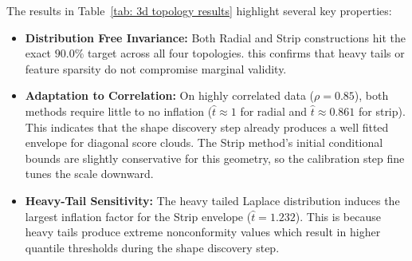 \begin{table}[!htbp]
\centering
{}
\caption{Geometric adaptation benchmark across $3\text{D}$ score topologies ($\alpha = 0.10, N = 400$). Both Radial ($M=150$) 
and Strip ($M_{\text{bin}}=12$) envelopes achieve exact nominal coverage under distributional misspecification.}
\label{tab: 3d topology results}
\end{table}

The results in Table~\ref{tab: 3d topology results} highlight several key properties:
\begin{itemize}
    \item \textbf{Distribution Free Invariance:} Both Radial and Strip constructions hit the exact $90.0\%$ target across 
           all four topologies. this confirms that heavy tails or feature sparsity do not compromise marginal validity.
    \item \textbf{Adaptation to Correlation:} On highly correlated data ($\rho = 0.85$), both methods require little to no 
          inflation ($\hat t \approx 1$ for radial and $\hat t \approx 0.861$ for strip). This indicates that the shape 
          discovery step already produces a well fitted envelope for diagonal score clouds. The Strip method's initial 
          conditional bounds are slightly conservative for this geometry, so the calibration step fine tunes the 
          scale downward.
    \item \textbf{Heavy-Tail Sensitivity:} The heavy tailed Laplace distribution induces the largest inflation factor for 
           the Strip envelope ($\hat{t} = 1.232$). This is because heavy tails produce extreme nonconformity values which 
           result in higher quantile thresholds during the shape discovery step.
\end{itemize}

